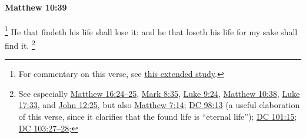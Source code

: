 			\begin{framed}
			\scriptsize
				\begin{compactdesc}
					\item[SBLG] 
				\end{compactdesc}
			\end{framed}

		\paragraph{Matthew 10:39} %
			\label{MATTHEW-10-39}

				\footnote{%
					For commentary on this verse, see \hyperref[EXSS-NT-MATTHEW-10-39-SELF]{this extended study}.
					}%
			He that findeth his life shall lose it: and he that loseth his life for my sake shall find it.%
				\footnote{%
					See especially \hyperref[MATTHEW-16-24]{Matthew 16:24--25}, \hyperref[MARK-8-35]{Mark 8:35}, \hyperref[LUKE-9-24]{Luke 9:24}, \hyperref[MATTHEW-10-38]{Matthew 10:38}, \hyperref[LUKE-17-33]{Luke 17:33}, and \hyperref[JOHN-12-25]{John 12:25}, but also \hyperref[MATTHEW-7-14]{Matthew 7:14}; \hyperref[DC98-13]{DC 98:13} (a useful elaboration of this verse, since it clarifies that the found life is ``eternal life''); \hyperref[DC101-15]{DC 101:15}; \hyperref[DC103-27]{DC 103:27--28}; 
					}

